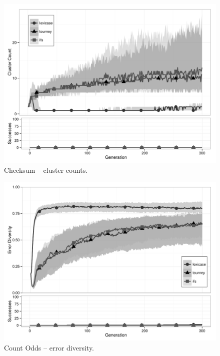 \begin{figure}[p] %
\centering
\includegraphics[width=11.5cm]{checksum-cluster.pdf}
\caption{Checksum -- cluster counts.}
\label{checksumClu}
\end{figure}

\begin{figure}[p] %
\centering
\includegraphics[width=11.5cm]{count-odds-diversity.pdf}
\caption{Count Odds -- error diversity.}
\label{count-oddsDiv}
\end{figure}

